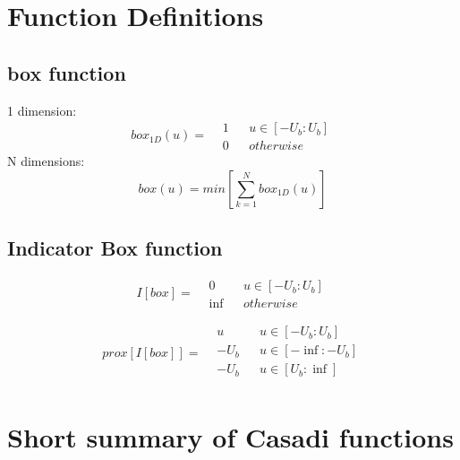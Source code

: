 \section{Function Definitions}
	\subsection{box function}
		1 dimension:
		\begin{equation}
			box_{1D}(u) =
			\begin{aligned}
			 & 1 && u \in [-U_b:U_b]\\
			 & 0 && otherwise
			\end{aligned}
			\label{eq:box function 1 dimension}
		\end{equation}
		N dimensions:
		\begin{equation}
		box(u) = min\left[ \sum_{k=1}^ N box_{1D}(u) \right]
		\label{eq:box function N dimensions}
		\end{equation}
	\subsection{Indicator Box function}
		\begin{equation}
			I[box]=
			\begin{aligned}
			& 0 && u \in [-U_b:U_b]\\
			& \inf && otherwise
			\end{aligned}
		\end{equation}
		
		\begin{equation}
		prox[I[box]]=
		\begin{aligned}
		& u && u \in [-U_b:U_b]\\
		& -U_b && u \in [-\inf:-U_b]\\
		& -U_b && u \in [U_b:\inf]\\
		\end{aligned}
		\end{equation}
\section{Short summary of Casadi functions}